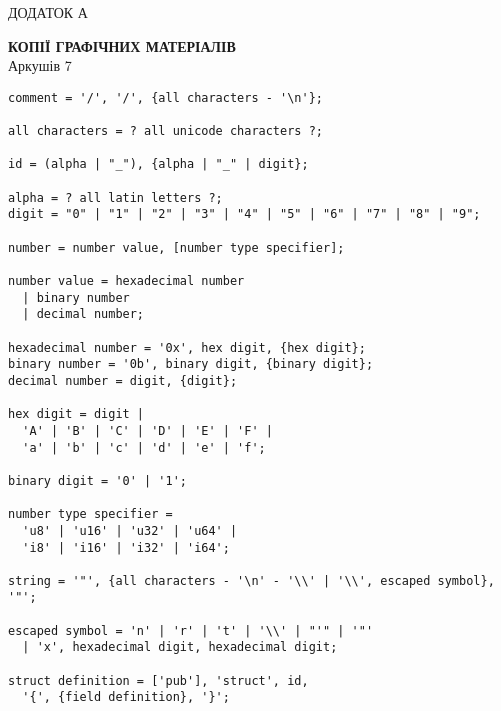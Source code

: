 \documentclass[main.tex]{subfiles}
\begin{document}
\renewcommand\stamppartname{Копії графічних матеріалів}

\begin{specialpage}
  \MakeUppercase{Додаток А}\\
  \MakeUppercase{\stampname{}}

  \vspace*{\fill}
  \textbf{\MakeUppercase{\stamppartname{}}}\\
  Аркушів 7%

  \vspace*{\fill}
  \mypagefooter{}
\end{specialpage}

\begin{center}
\noindent%
\begin{verbatim}
comment = '/', '/', {all characters - '\n'};

all characters = ? all unicode characters ?;

id = (alpha | "_"), {alpha | "_" | digit};

alpha = ? all latin letters ?;
digit = "0" | "1" | "2" | "3" | "4" | "5" | "6" | "7" | "8" | "9";

number = number value, [number type specifier];

number value = hexadecimal number
  | binary number
  | decimal number;

hexadecimal number = '0x', hex digit, {hex digit};
binary number = '0b', binary digit, {binary digit};
decimal number = digit, {digit};

hex digit = digit |
  'A' | 'B' | 'C' | 'D' | 'E' | 'F' |
  'a' | 'b' | 'c' | 'd' | 'e' | 'f';

binary digit = '0' | '1';

number type specifier =
  'u8' | 'u16' | 'u32' | 'u64' |
  'i8' | 'i16' | 'i32' | 'i64';

string = '"', {all characters - '\n' - '\\' | '\\', escaped symbol}, '"';

escaped symbol = 'n' | 'r' | 't' | '\\' | "'" | '"'
  | 'x', hexadecimal digit, hexadecimal digit;

struct definition = ['pub'], 'struct', id,
  '{', {field definition}, '}';


\end{verbatim}
\end{center}
\end{document}
